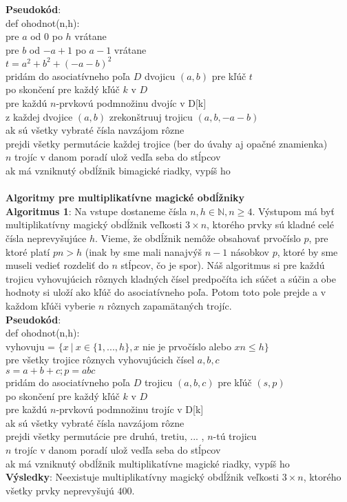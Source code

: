 \documentclass[12pt]{article}
\begin{document}
\textbf{Pseudokód}: \\
def ohodnot(n,h): \\
pre $a$ od $0$ po $h$ vrátane \\
pre $b$ od $-a+1$ po $a-1$ vrátane \\
$t = a^2 + b^2 + (-a-b)^2$ \\
pridám do asociatívneho poľa $D$ dvojicu $(a,b)$ pre kľúč $t$ \\
po skončení pre každý kľúč $k$ v $D$ \\
pre každú $n$-prvkovú podmnožinu dvojíc v D[k] \\
z každej dvojice $(a,b)$ zrekonštruuj trojicu $(a,b,-a-b)$ \\
ak sú všetky vybraté čísla navzájom rôzne \\
prejdi všetky permutácie každej trojice (ber do úvahy aj opačné znamienka) \\
$n$ trojíc v danom poradí ulož vedľa seba do stĺpcov \\
ak má vzniknutý obdĺžnik bimagické riadky, vypíš ho \\\\

\textbf{Algoritmy pre multiplikatívne magické obdĺžniky} \\

\textbf{Algoritmus 1}: Na vstupe dostaneme čísla $n,h \in \mathbb{N}, n \geq 4$. Výstupom má byť multiplikatívny magický obdĺžnik veľkosti $3 \times n$, ktorého prvky sú kladné celé čísla neprevyšujúce $h$. Vieme, že obdĺžnik nemôže obsahovať prvočíslo $p$, pre ktoré platí $pn > h$ (inak by sme mali nanajvýš $n-1$ násobkov $p$, ktoré by sme museli vedieť rozdeliť do $n$ stĺpcov, čo je spor). Náš algoritmus si pre každú trojicu vyhovujúcich rôznych kladných čísel predpočíta ich súčet a súčin a obe hodnoty si uloží ako kľúč do asociatívneho poľa. Potom toto pole prejde a v každom kľúči vyberie $n$ rôznych zapamätaných trojíc. \\

\textbf{Pseudokód}: \\
def ohodnot(n,h): \\
vyhovuju = $ \{x ~|~ x \in \{1, ... , h\}, x$ nie je prvočíslo alebo $xn \leq h\}$ \\
pre všetky trojice rôznych vyhovujúcich čísel $a,b,c$ \\
$s = a+b+c; p = abc$ \\
pridám do asociatívneho poľa $D$ trojicu $(a,b,c)$ pre kľúč $(s,p)$ \\
po skončení pre každý kľúč $k$ v $D$ \\
pre každú $n$-prvkovú podmnožinu trojíc v D[k] \\
ak sú všetky vybraté čísla navzájom rôzne \\
prejdi všetky permutácie pre druhú, tretiu, ... , $n$-tú trojicu \\
$n$ trojíc v danom poradí ulož vedľa seba do stĺpcov \\
ak má vzniknutý obdĺžnik multiplikatívne magické riadky, vypíš ho \\

\textbf{Výsledky}: Neexistuje multiplikatívny magický obdĺžnik veľkosti $3 \times n$, ktorého všetky prvky neprevyšujú $400$. \\\\
\end{document}
